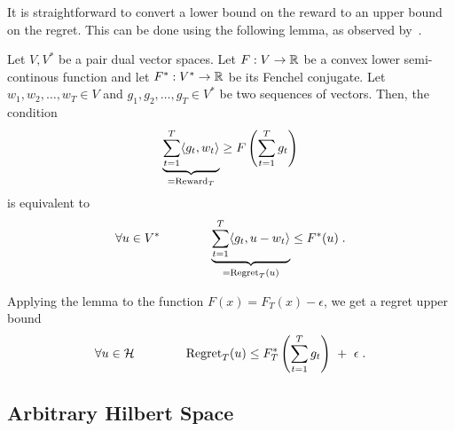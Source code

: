 It is straightforward to convert a lower bound on the reward to an upper bound
on the regret. This can be done using the following lemma, as observed
by~\cite{McMahanO14}.

\begin{lemma}
\label{lemma:reward-regret}
Let $V,V^*$ be a pair dual vector spaces. Let $F:V \to \mathbb{R}$ be a convex lower
semi-continous function and let $F^*:V^* \to \mathbb{R}$ be its Fenchel conjugate. Let
$w_1, w_2, \dots, w_T \in V$ and $g_1, g_2, \dots, g_T \in V^*$ be two sequences
of vectors.  Then, the condition
$$
\underbrace{\sum_{t=1}^T \langle g_t, w_t \rangle}_{=\operatorname{Reward}_T} \ge F\left( \sum_{t=1}^T g_t \right)
$$
is equivalent to
$$
\forall u \in V^* \qquad \qquad
\underbrace{\sum_{t=1}^T \langle g_t, u - w_t\rangle}_{=\operatorname{Regret}_T(u)} \le F^*(u) \; .
$$
\end{lemma}

Applying the lemma to the function $F(x) = F_T(x) - \epsilon$, we get a regret
upper bound
$$
\forall u \in \mathcal{H} \qquad \qquad
\operatorname{Regret}_T(u) \le F_T^*\left(\sum_{t=1}^T g_t \right) \ + \ \epsilon \; .
$$

\subsection{Arbitrary Hilbert Space}

